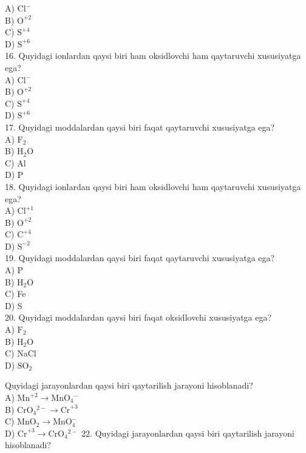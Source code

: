 A) $\mathrm{Cl}^{-}$\\
B) $\mathrm{O}^{+2}$\\
C) $\mathrm{S}^{+4}$\\
D) $\mathrm{S}^{+6}$\\
16. Quyidagi ionlardan qaysi biri ham oksidlovchi ham qaytaruvchi xususiyatga ega?\\
A) $\mathrm{Cl}^{-}$\\
B) $\mathrm{O}^{+2}$\\
C) $\mathrm{S}^{+4}$\\
D) $\mathrm{S}^{+6}$\\
17. Quyidagi moddalardan qaysi biri faqat qaytaruvchi xususiyatga ega?\\
A) $\mathrm{F}_{2}$\\
B) $\mathrm{H}_{2} \mathrm{O}$\\
C) Al\\
D) P\\
18. Quyidagi ionlardan qaysi biri ham oksidlovchi ham qaytaruvchi xususiyatga ega?\\
A) $\mathrm{Cl}^{+1}$\\
B) $\mathrm{O}^{+2}$\\
C) $\mathrm{C}^{+4}$\\
D) $\mathrm{S}^{-2}$\\
19. Quyidagi moddalardan qaysi biri faqat qaytaruvchi xususiyatga ega?\\
A) P\\
B) $\mathrm{H}_{2} \mathrm{O}$\\
C) Fe\\
D) S\\
20. Quyidagi moddalardan qaysi biri faqat oksidlovchi xususiyatga ega?\\
A) $\mathrm{F}_{2}$\\
B) $\mathrm{H}_{2} \mathrm{O}$\\
C) NaCl\\
D) $\mathrm{SO}_{2}$
  \item Quyidagi jarayonlardan qaysi biri qaytarilish jarayoni hisoblanadi?\\
A) $\mathrm{Mn}^{+2} \rightarrow \mathrm{MnO}_{4}{ }^{-}$\\
B) $\mathrm{CrO}_{4}{ }^{2-} \rightarrow \mathrm{Cr}^{+3}$\\
C) $\mathrm{MnO}_{2} \rightarrow \mathrm{MnO}_{4}^{-}$\\
D) $\mathrm{Cr}^{+3} \rightarrow \mathrm{CrO}_{4}{ }^{2-}$
22. Quyidagi jarayonlardan qaysi biri qaytarilish jarayoni hisoblanadi?\\
